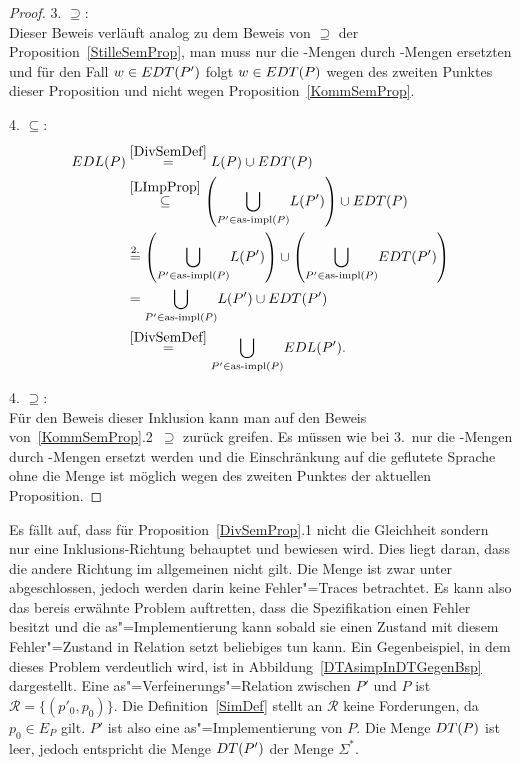 \begin{proof}
  3. \glqq$\supseteq$\grqq{}:\\
  Dieser Beweis verläuft analog zu dem Beweis von \glqq$\supseteq$\grqq{} der
  Proposition~\ref{StilleSemProp}, man muss nur die \ET{}-Mengen durch
  \EDT{}-Mengen ersetzten und für den Fall $w\in EDT (P')$ folgt $w\in EDT (P)$
  wegen des zweiten Punktes dieser Proposition und nicht wegen
  Proposition~\ref{KommSemProp}.

  4. \glqq$\subseteq$\grqq{}:
  {\allowdisplaybreaks
  \begin{align*}
    EDL (P)&\overset{\ref{DivSemDef}}{=} L (P)\cup EDT (P)\\
    &\overset{\ref{LImpProp}}{\subseteq} \left(\underset{P'\in \mathrm{as}\text{-}\mathrm{impl}
    (P)}{\bigcup} L (P')\right) \cup EDT (P)\\
    &\overset{2.}{=} \left(\underset{P'\in \mathrm{as}\text{-}\mathrm{impl} (P)}{\bigcup} L (P')\right)
    \cup \left(\underset{P'\in \mathrm{as}\text{-}\mathrm{impl} (P)}{\bigcup} EDT (P')\right)\\
    &= \underset{P'\in \mathrm{as}\text{-}\mathrm{impl} (P)}{\bigcup} L (P') \cup EDT (P')\\
    &\overset{\ref{DivSemDef}}{=} \underset{P'\in\mathrm{as}\text{-}\mathrm{impl} (P)}{\bigcup} EDL
    (P').
  \end{align*}}

  4. \glqq$\supseteq$\grqq{}:\\
  Für den Beweis dieser Inklusion kann man auf den Beweis
  von~\ref{KommSemProp}.2~\glqq$\supseteq$\grqq{} zurück greifen. Es müssen
  wie bei 3.\ nur die \ET{}-Mengen durch \EDT{}-Mengen ersetzt werden und die
  Einschränkung auf die geflutete Sprache ohne die Menge \EDT{} ist möglich
  wegen des zweiten Punktes der aktuellen Proposition.
\end{proof}

Es fällt auf, dass für Proposition~\ref{DivSemProp}.1 nicht die Gleichheit
sondern nur eine Inklusions-Richtung behauptet und bewiesen wird. Dies liegt
daran, dass die andere Richtung im allgemeinen nicht gilt. Die Menge \DT{} ist
zwar unter \cont{} abgeschlossen, jedoch werden darin keine Fehler"=Traces
betrachtet. Es kann also das bereis erwähnte Problem auftretten, dass die
Spezifikation einen Fehler besitzt und die as"=Implementierung kann sobald sie
einen Zustand mit diesem Fehler"=Zustand in Relation setzt beliebiges tun kann.
Ein Gegenbeispiel, in dem dieses Problem verdeutlich wird, ist in
Abbildung~\ref{DTAsimpInDTGegenBsp} dargestellt. Eine
as"=Verfeinerungs"=Relation zwischen $P'$ und $P$ ist $\mathcal{R} =
\{(p'_0,p_0)\}$. Die Definition~\ref{SimDef} stellt an $\mathcal{R}$ keine
Forderungen, da $p_0\in E_P$ gilt. $P'$ ist also eine as"=Implementierung von
$P$. Die Menge $DT (P)$ ist leer, jedoch entspricht die Menge $DT (P')$ der
Menge $\Sigma ^*$.

